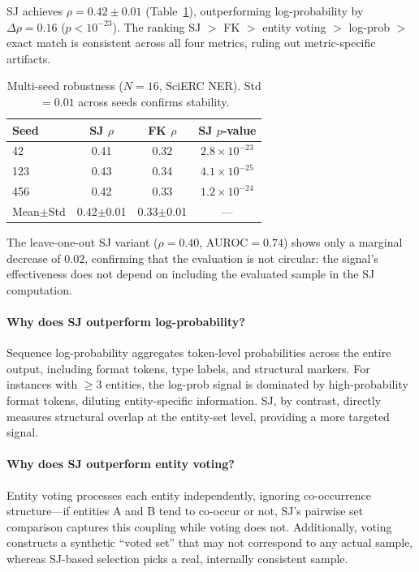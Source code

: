 \documentclass[11pt,a4paper]{article}
\begin{document}
SJ achieves $\rho{=}0.42 \pm 0.01$ (Table~\ref{tab:multiseed}), outperforming log-probability by $\Delta\rho{=}0.16$ ($p < 10^{-23}$). The ranking SJ $>$ FK $>$ entity voting $>$ log-prob $>$ exact match is consistent across all four metrics, ruling out metric-specific artifacts.

\begin{table}[t]
\centering
\small
\caption{Multi-seed robustness ($N{=}16$, SciERC NER). Std$=0.01$ across seeds confirms stability.}
\label{tab:multiseed}
\begin{tabular}{lccc}
\toprule
\textbf{Seed} & \textbf{SJ $\rho$} & \textbf{FK $\rho$} & \textbf{SJ $p$-value} \\
\midrule
42  & 0.41 & 0.32 & $2.8 \times 10^{-23}$ \\
123 & 0.43 & 0.34 & $4.1 \times 10^{-25}$ \\
456 & 0.42 & 0.33 & $1.2 \times 10^{-24}$ \\
\midrule
Mean$\pm$Std & 0.42$\pm$0.01 & 0.33$\pm$0.01 & --- \\
\bottomrule
\end{tabular}
\end{table}

The leave-one-out SJ variant ($\rho{=}0.40$, AUROC$=0.74$) shows only a marginal decrease of $0.02$, confirming that the evaluation is not circular: the signal's effectiveness does not depend on including the evaluated sample in the SJ computation.

\paragraph{Why does SJ outperform log-probability?}
Sequence log-probability aggregates token-level probabilities across the entire output, including format tokens, type labels, and structural markers. For instances with $\geq$3 entities, the log-prob signal is dominated by high-probability format tokens, diluting entity-specific information. SJ, by contrast, directly measures structural overlap at the entity-set level, providing a more targeted signal.

\paragraph{Why does SJ outperform entity voting?}
Entity voting processes each entity independently, ignoring co-occurrence structure---if entities A and B tend to co-occur or not, SJ's pairwise set comparison captures this coupling while voting does not. Additionally, voting constructs a synthetic ``voted set'' that may not correspond to any actual sample, whereas SJ-based selection picks a real, internally consistent sample.
\end{document}
